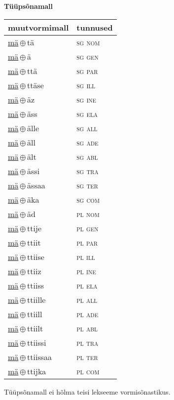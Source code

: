 

\vspace{3.5em}
\noindent \begin{minipage}{\textwidth}
\noindent \textbf{Tüüpsõnamall \,}\\

\begin{sideways}
\begin{tabular}{l l}
muutvormimall & tunnused \\
\hline
\underline{mä}\,$\oplus$\,tä & \textsc{ sg nom } \\
\underline{mä}\,$\oplus$\,ä & \textsc{ sg gen } \\
\underline{mä}\,$\oplus$\,ttä & \textsc{ sg par } \\
\underline{mä}\,$\oplus$\,ttäse & \textsc{ sg ill } \\
\underline{mä}\,$\oplus$\,äz & \textsc{ sg ine } \\
\underline{mä}\,$\oplus$\,äss & \textsc{ sg ela } \\
\underline{mä}\,$\oplus$\,älle & \textsc{ sg all } \\
\underline{mä}\,$\oplus$\,äll & \textsc{ sg ade } \\
\underline{mä}\,$\oplus$\,ält & \textsc{ sg abl } \\
\underline{mä}\,$\oplus$\,ässi & \textsc{ sg tra } \\
\underline{mä}\,$\oplus$\,ässaa & \textsc{ sg ter } \\
\underline{mä}\,$\oplus$\,äka & \textsc{ sg com } \\
\underline{mä}\,$\oplus$\,äd & \textsc{ pl nom } \\
\underline{mä}\,$\oplus$\,ttije & \textsc{ pl gen } \\
\underline{mä}\,$\oplus$\,ttiit & \textsc{ pl par } \\
\underline{mä}\,$\oplus$\,ttiise & \textsc{ pl ill } \\
\underline{mä}\,$\oplus$\,ttiiz & \textsc{ pl ine } \\
\underline{mä}\,$\oplus$\,ttiiss & \textsc{ pl ela } \\
\underline{mä}\,$\oplus$\,ttiille & \textsc{ pl all } \\
\underline{mä}\,$\oplus$\,ttiill & \textsc{ pl ade } \\
\underline{mä}\,$\oplus$\,ttiilt & \textsc{ pl abl } \\
\underline{mä}\,$\oplus$\,ttiissi & \textsc{ pl tra } \\
\underline{mä}\,$\oplus$\,ttiissaa & \textsc{ pl ter } \\
\underline{mä}\,$\oplus$\,ttijka & \textsc{ pl com } \\
\end{tabular}
\end{sideways}
\label{tab:tüüpsõnamall-mätä}

\end{minipage}

 
\vspace{1em}
\noindent Tüüpsõnamall  ei hõlma teisi lekseeme vormi\-sõnastikus.
